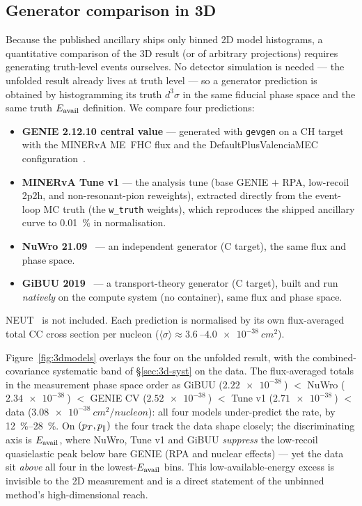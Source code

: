 \subsection{Generator comparison in 3D}
\label{sec:3d-models}
Because the published ancillary ships only binned 2D model histograms, a
quantitative comparison of the 3D result (or of arbitrary projections) requires
generating truth-level events ourselves. No detector simulation is needed --- the
unfolded result already lives at truth level --- so a generator prediction is
obtained by histogramming its truth $d^{3}\sigma$ in the same fiducial phase
space and the same truth $E_{\mathrm{avail}}$ definition. We compare four predictions: 
\begin{itemize}
  \item \textbf{GENIE 2.12.10 central value} --- generated with \texttt{gevgen}
        on a CH target with the MINERvA ME~FHC flux and the
        DefaultPlusValenciaMEC configuration~\cite{Andreopoulos:2009rq}.
  \item \textbf{MINERvA Tune v1} --- the analysis tune (base GENIE $+$ RPA,
        low-recoil 2p2h, and non-resonant-pion reweights), extracted directly
        from the event-loop MC truth (the \texttt{w\_truth} weights), which
        reproduces the shipped ancillary curve to \SI{0.01}{\percent} in
        normalisation.
  \item \textbf{NuWro 21.09}~\cite{Golan:2012wx} --- an independent generator
        (C target), the same flux and phase space.
  \item \textbf{GiBUU 2019}~\cite{Buss:2011mx} --- a transport-theory generator
        (C target), built and run \emph{natively} on the compute system (no
        container), same flux and phase space.
\end{itemize}
NEUT~\cite{Hayato:2009zz} is not included.
Each prediction is normalised by its own flux-averaged total CC cross
section per nucleon ($\langle\sigma\rangle\approx\SI{3.6}{}$--$\SI{4.0e-38}{cm^2}$).

Figure~\ref{fig:3dmodels} overlays the four on the unfolded result, with the
combined-covariance systematic band of \S\ref{sec:3d-syst} on the data. The
flux-averaged totals in the measurement phase space order as
GiBUU ($\SI{2.22e-38}{}$) $<$ NuWro ($\SI{2.34e-38}{}$) $<$ GENIE CV
($\SI{2.52e-38}{}$) $<$ Tune v1 ($\SI{2.71e-38}{}$) $<$ data
($\SI{3.08e-38}{cm^2/nucleon}$): all four models under-predict the rate, by
\SIrange{12}{28}{\percent}. On $(p_{T},p_{\parallel})$ the four track the data shape
closely; the discriminating axis is $E_{\mathrm{avail}}$, where NuWro, Tune v1 and GiBUU
\emph{suppress} the low-recoil quasielastic peak below bare GENIE (RPA and
nuclear effects) --- yet the data sit \emph{above} all four in the
lowest-$E_{\mathrm{avail}}$ bins. This low-available-energy excess is invisible to the 2D
measurement and is a direct statement of the unbinned method's high-dimensional
reach.

